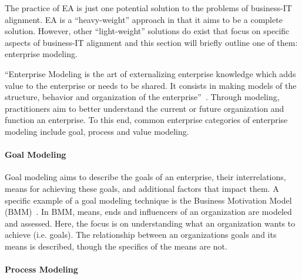 The practice of EA is just one potential solution to the problems of business-IT alignment. EA is a ``heavy-weight'' approach in that it aims to be a complete solution. However, other ``light-weight'' solutions do exist that focus on specific aspects of business-IT alignment and this section will briefly outline one of them: enterprise modeling.
  

``Enterprise Modeling is the art of externalizing enterprise knowledge which adds value to the enterprise or needs to be shared. It consists in making models of the structure, behavior and organization of the enterprise''~\cite{Vernadat200215}. Through modeling, practitioners aim to better understand the current or future organization and function an enterprise. To this end, common enterprise categories of enterprise modeling include goal, process and value modeling. 

\paragraph*{Goal Modeling}

Goal modeling aims to describe the goals of an enterprise, their interrelations, means for achieving these goals, and additional factors that impact them. A specific example of a goal modeling technique is the Business Motivation Model (BMM)~\cite{bmm2010}. In BMM, means, ends and influencers of an organization are modeled and assessed. Here, the focus is on understanding what an organization wants to achieve (i.e. goals). The relationship between an organizations goals and its means is described, though the specifics of the means are not. 

\paragraph*{Process Modeling}

